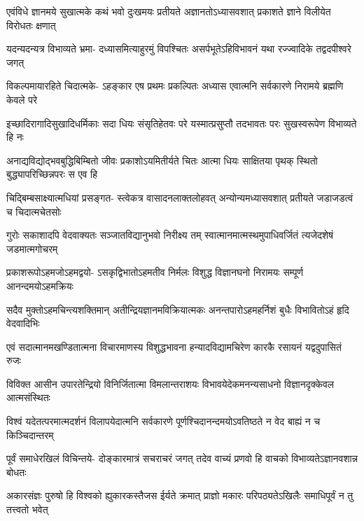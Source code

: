 \fourlineindentedshloka
{एवंविधे ज्ञानमये सुखात्मके}
{कथं भवो दुःखमयः प्रतीयते}
{अज्ञानतोऽध्यासवशात् प्रकाशते}
{ज्ञाने विलीयेत विरोधतः क्षणात्} %

\fourlineindentedshloka
{यदन्यदन्यत्र विभाव्यते भ्रमा-}
{दध्यासमित्याहुरमुं विपश्चितः}
{असर्पभूतेऽहिविभावनं यथा}
{रज्ज्वादिके तद्वदपीश्वरे जगत्} %

\fourlineindentedshloka
{विकल्पमायारहिते चिदात्मके-}
{ऽहङ्कार एष प्रथमः प्रकल्पितः}
{अध्यास एवात्मनि सर्वकारणे}
{निरामये ब्रह्मणि केवले परे} %

\fourlineindentedshloka
{इच्छादिरागादिसुखादिधर्मिकाः}
{सदा धियः संसृतिहेतवः परे}
{यस्मात्प्रसुप्तौ तदभावतः परः}
{सुखस्वरूपेण विभाव्यते हि नः} %

\fourlineindentedshloka
{अनाद्यविद्योद्भवबुद्धिबिम्बितो}
{जीवः प्रकाशोऽयमितीर्यते चितः}
{आत्मा धियः साक्षितया पृथक् स्थितो}
{बुद्ध्यापरिच्छिन्नपरः स एव हि} %

\fourlineindentedshloka
{चिद्बिम्बसाक्ष्यात्मधियां प्रसङ्गत-}
{स्त्वेकत्र वासादनलाक्तलोहवत्}
{अन्योन्यमध्यासवशात् प्रतीयते}
{जडाजडत्वं च चिदात्मचेतसोः} %

\fourlineindentedshloka
{गुरोः सकाशादपि वेदवाक्यतः}
{सञ्जातविद्यानुभवो निरीक्ष्य तम्}
{स्वात्मानमात्मस्थमुपाधिवर्जितं}
{त्यजेदशेषं जडमात्मगोचरम्} %

\fourlineindentedshloka
{प्रकाशरूपोऽहमजोऽहमद्वयो-}
{ऽसकृद्विभातोऽहमतीव निर्मलः}
{विशुद्ध विज्ञानघनो निरामयः}
{सम्पूर्ण आनन्दमयोऽहमक्रियः} %

\fourlineindentedshloka
{सदैव मुक्तोऽहमचिन्त्यशक्तिमान्}
{अतीन्द्रियज्ञानमविक्रियात्मकः}
{अनन्तपारोऽहमहर्निशं बुधैः}
{विभावितोऽहं हृदि वेदवादिभिः} %

\fourlineindentedshloka
{एवं सदात्मानमखण्डितात्मना}
{विचारमाणस्य विशुद्धभावना}
{हन्यादविद्यामचिरेण कारकै}
{रसायनं यद्वदुपासितं रुजः} %

\fourlineindentedshloka
{विविक्त आसीन उपारतेन्द्रियो}
{विनिर्जितात्मा विमलान्तराशयः}
{विभावयेदेकमनन्यसाधनो}
{विज्ञानदृक्केवल आत्मसंस्थितः} %

\fourlineindentedshloka
{विश्वं यदेतत्परमात्मदर्शनं}
{विलापयेदात्मनि सर्वकारणे}
{पूर्णश्चिदानन्दमयोऽवतिष्ठते}
{न वेद बाह्यं न च किञ्चिदान्तरम्} %

\fourlineindentedshloka
{पूर्वं समाधेरखिलं विचिन्तये-}
{दोङ्कारमात्रं सचराचरं जगत्}
{तदेव वाच्यं प्रणवो हि वाचको}
{विभाव्यतेऽज्ञानवशान्न बोधतः} %

\fourlineindentedshloka
{अकारसंज्ञः पुरुषो हि विश्वको}
{ह्युकारकस्तैजस ईर्यते क्रमात्}
{प्राज्ञो मकारः परिपठ्यतेऽखिलैः}
{समाधिपूर्वं न तु तत्त्वतो भवेत्} %

